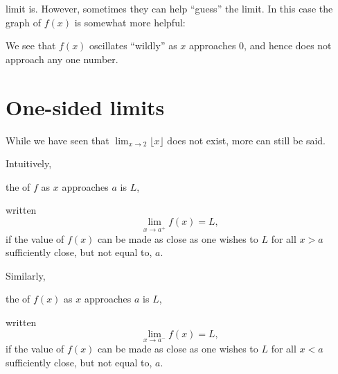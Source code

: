 \documentclass{ximera}
\begin{document}
\begin{question}
\begin{feedback}
    limit is. However, sometimes they can help ``guess'' the limit. In
    this case the graph of $f(x)$ is somewhat more helpful:
    \begin{image}
    \end{image}
   We see that $f(x)$ oscillates ``wildly'' as $x$ approaches $0$, and hence does not approach any one number.
  \end{feedback}
\end{question}



\section{One-sided limits}


While we have seen that $\displaystyle\lim_{x\to 2}\lfloor x\rfloor$ does not
exist, more can still be said.



\begin{definition}
  Intuitively,
  \begin{center}
    the  of $f$ as $x$ approaches $a$ is
    $L$,
  \end{center}
  written
  \[
  \lim_{x\to a^+} f(x) = L,
  \]
  if the value of $f(x)$ can be made as close as one wishes to $L$ for
  all $x>a$ sufficiently close, but not equal to, $a$.
  
  Similarly,
  \begin{center}
    the  of $f(x)$ as $x$ approaches $a$ is
    $L$,
  \end{center}
  written
  \[
  \displaystyle\lim_{x\to a^-} f(x) = L,
  \]
  if the value of $f(x)$ can be made as close as one wishes to $L$ for
  all $x<a$ sufficiently close, but not equal to, $a$.
\end{definition}
\end{document}
